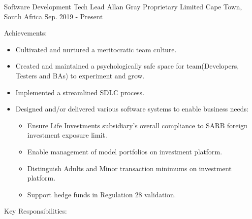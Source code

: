 

\begin{cventries}
  \cventry
    {Software Development Tech Lead} %
    {Allan Gray Proprietary Limited} %
    {Cape Town, South Africa} %
    {Sep. 2019 - Present} %
    {
      \begin{cvitems} %
        \item {Achievements:}
          \begin{itemize}
            \item {Cultivated and nurtured a meritocratic team culture.}
            \item {Created and maintained a psychologically safe space for team(Developers, Testers and BAs) to experiment and grow.}
            \item {Implemented a streamlined SDLC process.}
          \end{itemize}
        \begin{itemize}
          \item {Designed and/or delivered various software systems to enable business needs:}
          \begin{itemize}
            \item {Ensure Life Investments subsidiary's overall compliance to SARB foreign investment exposure limit.}  
            \item {Enable management of model portfolios on investment platform.}
            \item {Distinguish Adults and Minor transaction minimums on investment platform.}
            \item {Support hedge funds in Regulation 28 validation.}
          \end{itemize}
        \end{itemize}
        \item {Key Responsibilities:}

\end{cvitems}}
\end{cventries}
